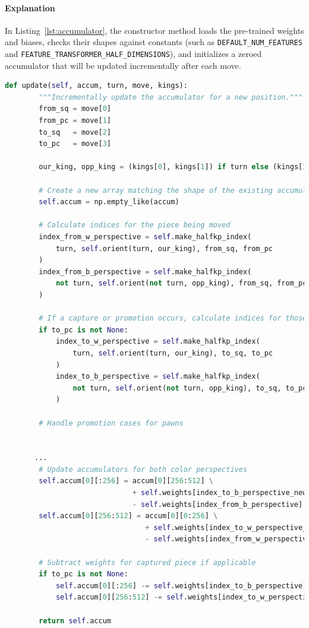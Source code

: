 \documentclass[12pt,a4paper]{article}
\begin{document}
\paragraph{Explanation}
In Listing~\ref{lst:accumulator}, the constructor method loads the pre-trained weights and biases, checks their shapes against constants (such as \texttt{DEFAULT\_NUM\_FEATURES} and \texttt{FEATURE\_TRANSFORMER\_HALF\_DIMENSIONS}), and initializes a zeroed accumulator that will be updated incrementally after each move.
\begin{lstlisting}[language=Python, caption={Part 2: The update method snippet }, label={lst:accumulator_update}, basicstyle=\footnotesize\ttfamily,breaklines=true]
    def update(self, accum, turn, move, kings):
        """Incrementally update the accumulator for a new position."""
        from_sq = move[0]
        from_pc = move[1]
        to_sq   = move[2]
        to_pc   = move[3]

        our_king, opp_king = (kings[0], kings[1]) if turn else (kings[1], kings[0])

        # Create a new array matching the shape of the existing accumulator
        self.accum = np.empty_like(accum)

        # Calculate indices for the piece being moved
        index_from_w_perspective = self.make_halfkp_index(
            turn, self.orient(turn, our_king), from_sq, from_pc
        )
        index_from_b_perspective = self.make_halfkp_index(
            not turn, self.orient(not turn, opp_king), from_sq, from_pc
        )

        # If a capture or promotion occurs, calculate indices for those scenarios
        if to_pc is not None:
            index_to_w_perspective = self.make_halfkp_index(
                turn, self.orient(turn, our_king), to_sq, to_pc
            )
            index_to_b_perspective = self.make_halfkp_index(
                not turn, self.orient(not turn, opp_king), to_sq, to_pc
            )

        # Handle promotion cases for pawns
       

       ...
        # Update accumulators for both color perspectives
        self.accum[0][:256] = accum[0][256:512] \
                              + self.weights[index_to_b_perspective_new] \
                              - self.weights[index_from_b_perspective]
        self.accum[0][256:512] = accum[0][0:256] \
                                 + self.weights[index_to_w_perspective_new] \
                                 - self.weights[index_from_w_perspective]

        # Subtract weights for captured piece if applicable
        if to_pc is not None:
            self.accum[0][:256] -= self.weights[index_to_b_perspective]
            self.accum[0][256:512] -= self.weights[index_to_w_perspective]

        return self.accum
\end{lstlisting}
\end{document}
